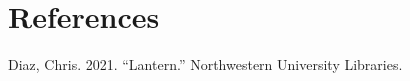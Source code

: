 \documentclass[
  11pt,
,
onecolumn,
openany
]{book}
\newenvironment{CSLReferences}%
  {}%
  {\par}
\begin{document}
\hypertarget{bibliography}{%
\chapter*{References}\label{bibliography}}

\hypertarget{refs}{}
\begin{CSLReferences}{1}{0}
\leavevmode{}%
Diaz, Chris. 2021. {``Lantern.''} Northwestern University Libraries.

\end{CSLReferences}
\end{document}
